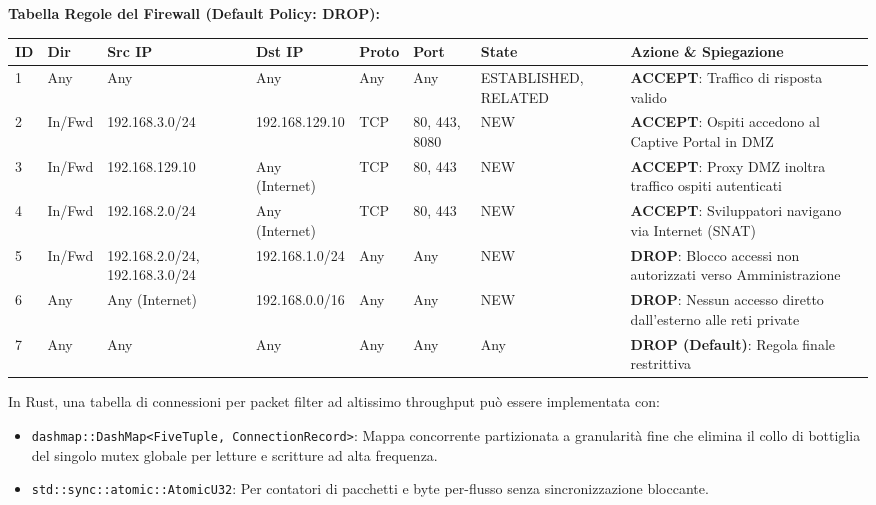 \documentclass[11pt,a4paper]{article}
\begin{document}
\begin{solutionbox}
\textbf{Tabella Regole del Firewall (Default Policy: DROP):}
\begin{center}
\small
\begin{tabularx}{\textwidth}{lllllllX}
\toprule
\textbf{ID} & \textbf{Dir} & \textbf{Src IP} & \textbf{Dst IP} & \textbf{Proto} & \textbf{Port} & \textbf{State} & \textbf{Azione \& Spiegazione} \\
\midrule
1 & Any & Any & Any & Any & Any & ESTABLISHED, RELATED & \textbf{ACCEPT}: Traffico di risposta valido \\
2 & In/Fwd & 192.168.3.0/24 & 192.168.129.10 & TCP & 80, 443, 8080 & NEW & \textbf{ACCEPT}: Ospiti accedono al Captive Portal in DMZ \\
3 & In/Fwd & 192.168.129.10 & Any (Internet) & TCP & 80, 443 & NEW & \textbf{ACCEPT}: Proxy DMZ inoltra traffico ospiti autenticati \\
4 & In/Fwd & 192.168.2.0/24 & Any (Internet) & TCP & 80, 443 & NEW & \textbf{ACCEPT}: Sviluppatori navigano via Internet (SNAT) \\
5 & In/Fwd & 192.168.2.0/24, 192.168.3.0/24 & 192.168.1.0/24 & Any & Any & NEW & \textbf{DROP}: Blocco accessi non autorizzati verso Amministrazione \\
6 & Any & Any (Internet) & 192.168.0.0/16 & Any & Any & NEW & \textbf{DROP}: Nessun accesso diretto dall'esterno alle reti private \\
7 & Any & Any & Any & Any & Any & Any & \textbf{DROP (Default)}: Regola finale restrittiva \\
\bottomrule
\end{tabularx}
\end{center}
\end{solutionbox}

\begin{altbox}
In Rust, una tabella di connessioni per packet filter ad altissimo throughput pu\`o essere implementata con:
\begin{itemize}
    \item \texttt{dashmap::DashMap<FiveTuple, ConnectionRecord>}: Mappa concorrente partizionata a granularit\`a fine che elimina il collo di bottiglia del singolo mutex globale per letture e scritture ad alta frequenza.
    \item \texttt{std::sync::atomic::AtomicU32}: Per contatori di pacchetti e byte per-flusso senza sincronizzazione bloccante.
\end{itemize}
\end{altbox}
\end{document}
